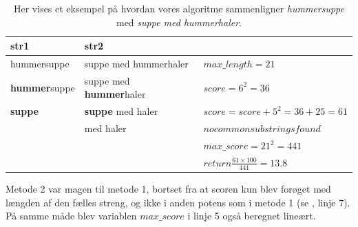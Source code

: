 \begin{table}
    \begin{tabular}{|l|l|l|}
        \hline
        str1        & str2                  & ~                             \\ \hline
hummersuppe & suppe med hummerhaler & $max\_length = 21$               \\         
        \textbf{hummer}suppe & suppe med \textbf{hummer}haler & $score = 6^2 = 36$               \\ 
        \textbf{suppe}       & \textbf{suppe} med haler       & $score = score + 5^2 = 36 + 25 = 61$                 \\ 
        ~           &  med haler            & $no common substrings found$        \\ 
        ~           & ~                     & $max\_score = 21^2  = 441$    \\ 
        ~           & ~                     & $return \frac{61 \times 100}{441} = 13.8$ \\
        \hline
    \end{tabular}
    \caption{Her vises et eksempel på hvordan vores algoritme sammenligner \textit{hummersuppe} med \textit{suppe med hummerhaler}.}
    \label{table:vores-compare-eksempel}
\end{table}

Metode 2 var magen til metode 1, bortset fra at scoren kun blev forøget med længden af den fælles streng, og ikke i anden potens som i metode 1 (se , linje 7). På samme måde blev variablen $max\_score$ i linje 5 også beregnet lineært.

\begin{algorithm} [H]
	\label{alg:compare}
	
\end{algorithm}

\begin{algorithm} [H]
	\label{alg:longest-common-substring}
	
\end{algorithm}

